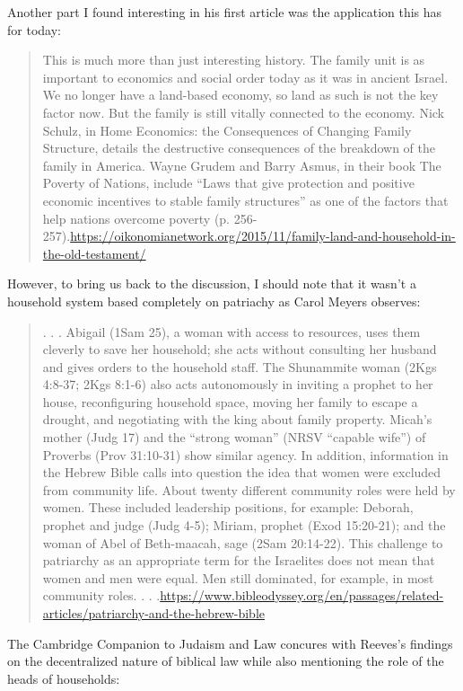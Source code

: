 \documentclass[11pt]{article}
\begin{document}
Another part I found interesting in his first article was the application this has for today:
\begin{quote}
This is much more than just interesting history. The family unit is as important to economics and social order today as it was in ancient Israel. We no longer have a land-based economy, so land as such is not the key factor now. But the family is still vitally connected to the economy. Nick Schulz, in Home Economics: the Consequences of Changing Family Structure, details the destructive consequences of the breakdown of the family in America. Wayne Grudem and Barry Asmus, in their book The Poverty of Nations, include “Laws that give protection and positive economic incentives to stable family structures” as one of the factors that help nations overcome poverty (p. 256-257).\url{https://oikonomianetwork.org/2015/11/family-land-and-household-in-the-old-testament/}
\end{quote} 


However, to bring us back to the discussion, I should note that it wasn't a household system based completely on patriachy as Carol Meyers observes:
\begin{quote}
. . . 
 Abigail (1Sam 25), a woman with access to resources, uses them cleverly to save her household; she acts without consulting her husband and gives orders to the household staff. The Shunammite woman (2Kgs 4:8-37; 2Kgs 8:1-6) also acts autonomously in inviting a prophet to her house, reconfiguring household space, moving her family to escape a drought, and negotiating with the king about family property. Micah’s mother (Judg 17) and the “strong woman” (NRSV “capable wife”) of Proverbs (Prov 31:10-31) show similar agency. In addition, information in the Hebrew Bible calls into question the idea that women were excluded from community life. About twenty different community roles were held by women. These included leadership positions, for example: Deborah, prophet and judge (Judg 4-5); Miriam, prophet (Exod 15:20-21); and the woman of Abel of Beth-maacah, sage (2Sam 20:14-22). This challenge to patriarchy as an appropriate term for the Israelites does not mean that women and men were equal. Men still dominated, for example, in most community roles. . . .\url{https://www.bibleodyssey.org/en/passages/related-articles/patriarchy-and-the-hebrew-bible}
\end{quote}


The Cambridge Companion to Judaism and Law concures with Reeves's findings on the decentralized nature of biblical law while also mentioning the role of the heads of households:
\end{document}
